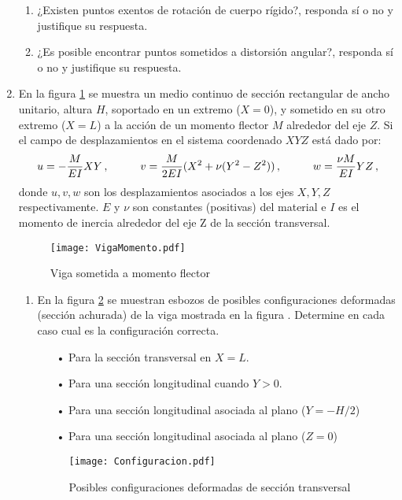 \documentclass[../notas medios.tex]{subfiles}
\begin{document}
\begin{enumerate}
\begin{enumerate}
\item ¿Existen puntos exentos de rotación de cuerpo rígido?, responda sí o no y 
justifique su respuesta.
	
\item ¿Es posible encontrar puntos sometidos a distorsión angular?, 
responda sí o no y justifique su respuesta.
\end{enumerate}


\item  \label{punto05_d}  En la figura \cref{VigaMomentoflec} se muestra un 
medio continuo de sección rectangular de ancho unitario, altura $H$, soportado 
en un extremo ($X = 0$), y sometido en su otro extremo ($X = L$) a la acci\'on 
de un momento flector $M$ alrededor del eje $Z$. Si el campo de desplazamientos 
en el sistema coordenado $XYZ$ está dado por:
\[u= -\dfrac{M}{EI} X Y\, ,  \hspace*{10mm}	
v = \dfrac{M}{2EI}(X^2+ \nu (Y^2-Z^2))\, ,  \hspace*{10mm}	
w = \dfrac{\nu M}{EI} Y Z\, ,  \]
donde $u,v,w$ son los desplazamientos asociados a los ejes $X,Y,Z$ 
respectivamente. $E$ y $\nu$ son constantes  (positivas) del material e $I$ es 
el momento de inercia alrededor del eje Z de la sección transversal.
\begin{figure}[H]
	\centering
	\texttt{[image: VigaMomento.pdf]}
	\caption{Viga sometida a momento flector}
	 \label{VigaMomentoflec}
\end{figure}

\begin{enumerate}
\item En la figura \cref{ConfiguraFlector} se muestran esbozos de posibles 
configuraciones deformadas (sección achurada) de la viga mostrada en la figura 
\label{VigaMomento}. Determine en cada caso cual es la configuración correcta. 

\begin{enumerate}

\item[•] Para la sección transversal en $X = L$. 
\item[•] Para una sección longitudinal cuando $Y > 0$.
\item[•] Para una sección longitudinal asociada al plano ($Y = -H/2$)
\item[•] Para una sección longitudinal asociada al plano ($Z = 0$) 

\end{enumerate}

\begin{figure}[H]
	\centering
	\texttt{[image: Configuracion.pdf]}
	\caption{Posibles configuraciones deformadas de sección transversal}
	\label{ConfiguraFlector}
\end{figure}


\end{enumerate}
\end{enumerate}
\end{document}
